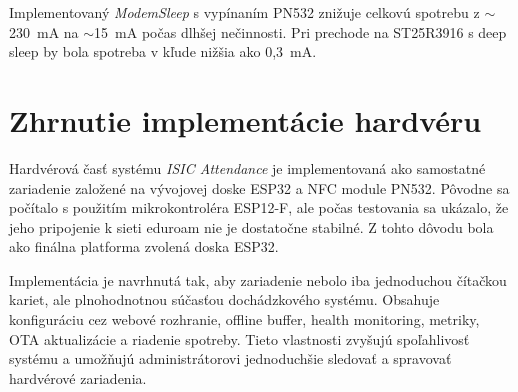 Implementovaný \textit{ModemSleep} s vypínaním PN532 znižuje celkovú spotrebu z $\sim$230~mA na $\sim$15~mA počas dlhšej nečinnosti. Pri prechode na ST25R3916 s deep sleep by bola spotreba v kľude nižšia ako 0,3~mA.

\section{Zhrnutie implementácie hardvéru}
\label{subsec:hardware-summary}

Hardvérová časť systému \textit{ISIC Attendance} je implementovaná ako samostatné zariadenie založené na vývojovej doske ESP32 a NFC module PN532. Pôvodne sa počítalo s použitím mikrokontroléra ESP12-F, ale počas testovania sa ukázalo, že jeho pripojenie k sieti eduroam nie je dostatočne stabilné. Z tohto dôvodu bola ako finálna platforma zvolená doska ESP32.

Implementácia je navrhnutá tak, aby zariadenie nebolo iba jednoduchou čítačkou kariet, ale plnohodnotnou súčasťou dochádzkového systému. Obsahuje konfiguráciu cez webové rozhranie, offline buffer, health monitoring, metriky, OTA aktualizácie a riadenie spotreby. Tieto vlastnosti zvyšujú spoľahlivosť systému a umožňujú administrátorovi jednoduchšie sledovať a spravovať hardvérové zariadenia.